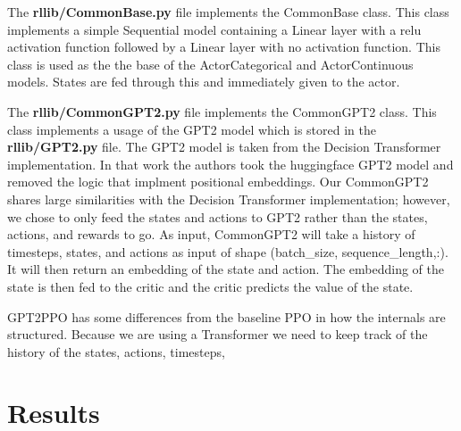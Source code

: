 The \textbf{rllib/CommonBase.py} file implements the CommonBase class. This class implements a simple Sequential model containing a 
Linear layer with a relu activation function followed by a Linear layer with no activation function. This class is used as the
the base of the ActorCategorical and ActorContinuous models. States are fed through this and immediately given to the actor. 

The \textbf{rllib/CommonGPT2.py} file implements the CommonGPT2 class. This class implements a usage of the GPT2 model which is stored 
in the \textbf{rllib/GPT2.py} file. The GPT2 model is taken from the Decision Transformer implementation\cite{chen2021decision}. In that work
the authors took the huggingface GPT2 model and removed the logic that implment positional embeddings\cite{radford2019language,wolf-etal-2020-transformers}.
Our CommonGPT2 shares large similarities with the Decision Transformer implementation\cite{chen2021decision}; however, we chose to only 
feed the states and actions to GPT2 rather than the states, actions, and rewards to go. As input, CommonGPT2 will take a history of timesteps, states, 
and actions as input of shape (batch\_size, sequence\_length,:). It will then return an embedding of the state and action. The embedding of the 
state is then fed to the critic and the critic predicts the value of the state. 

GPT2PPO has some differences from the baseline PPO in how the internals are structured. Because we are using a Transformer we need to keep track of the 
history of the states, actions, timesteps, 




\section{Results}



